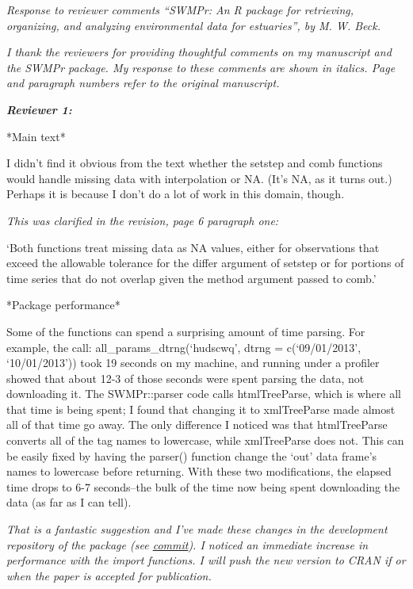 \documentclass[letterpaper,12pt]{article}\usepackage[]{graphicx}\usepackage[]{color}
\newcommand{\Bigtxt}[1]{\textbf{\textit{#1}}}
\begin{document}
\raggedright


{\it Response to reviewer comments ``SWMPr: An R package for retrieving, organizing, and analyzing environmental data for estuaries'', by M. W. Beck.}

{\it I thank the reviewers for providing thoughtful comments on my manuscript and the SWMPr package.  My response to these comments are shown in italics.  Page and paragraph numbers refer to the original manuscript.}

\Bigtxt{Reviewer 1:}

*Main text*

I didn't find it obvious from the text whether the setstep and comb functions would handle missing data with interpolation or NA. (It's NA, as it turns out.) Perhaps it is because I don't do a lot of work in this domain, though.

{\it This was clarified in the revision, page 6 paragraph one:

`Both functions treat missing data as NA values, either for observations that exceed the allowable tolerance for the differ argument of setstep or for portions of time series that do not overlap given the method argument passed to comb.' 
}

*Package performance*

Some of the functions can spend a surprising amount of time parsing. For example, the call: all\_params\_dtrng(`hudscwq', dtrng = c(`09/01/2013', `10/01/2013')) took 19 seconds on my machine, and running under a profiler showed that about 12-3 of those seconds were spent parsing the data, not downloading it. The SWMPr::parser code calls htmlTreeParse, which is where all that time is being spent; I found that changing it to xmlTreeParse made almost all of that time go away. The only difference I noticed was that htmlTreeParse converts all of the tag names to lowercase, while xmlTreeParse does not. This can be easily fixed by having the parser() function change the `out' data frame's names to lowercase before returning. With these two modifications, the elapsed time drops to 6-7 seconds--the bulk of the time now being spent downloading the data (as far as I can tell).

{\it That is a fantastic suggestion and I've made these changes in the development repository of the package (see \href{https://github.com/fawda123/SWMPr/commit/3a90bddabbeace917b54942a68449ef9be93ad1d}{commit}).  I noticed an immediate increase in performance with the import functions.  I will push the new version to CRAN if or when the paper is accepted for publication. 
}
\end{document}
